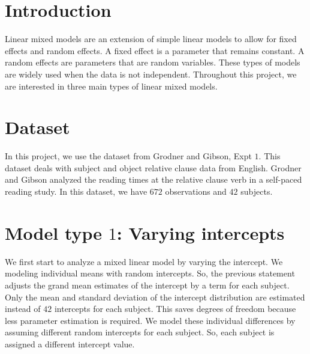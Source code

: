 \documentclass{article}
\begin{document}
\section{Introduction}

Linear mixed models are an extension of simple linear models to allow for fixed effects and random effects. A fixed effect is a parameter that remains constant. A random effects are parameters that are random variables. These types of models are widely used when the data is not independent.
Throughout this project, we are interested in three main types of linear mixed models.

\section{Dataset}

In this project, we use the dataset from Grodner and Gibson, Expt $1$.
This dataset deals with subject and object relative clause data from English.
Grodner and Gibson analyzed the reading times at the relative clause verb in a self-paced reading study. In this dataset, we have $672$ observations and $42$ subjects.



\section{Model type $1$: Varying intercepts}
We first start to analyze a mixed linear model by varying the intercept.
We modeling individual means with random intercepts.
So, the previous statement adjusts the grand mean estimates of the intercept by a term for each subject. Only the mean and standard deviation of the intercept distribution are estimated instead of $42$ intercepts for each subject.
This saves degrees of freedom because less parameter estimation is required.
We  model these individual differences by assuming different random intercepts for each subject. So, each subject is assigned a different intercept value.
\end{document}
